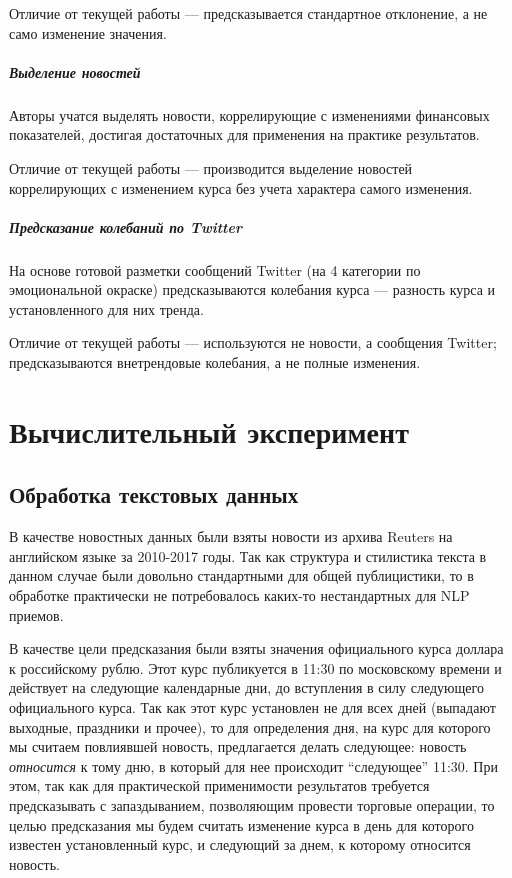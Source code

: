 \documentclass[pdftex,ptm,14pt,a4paper]{report}
\begin{document}
Отличие от текущей работы --- предсказывается стандартное отклонение, а не само изменение значения.

\paragraph{Выделение новостей \cite{select_important_news}}

Авторы учатся выделять новости, коррелирующие с изменениями финансовых показателей, достигая достаточных для
применения на практике результатов.

Отличие от текущей работы --- производится выделение новостей коррелирующих с изменением курса без учета характера
самого изменения.

\paragraph{Предсказание колебаний по Twitter \cite{stock_from_twitter}}

На основе готовой разметки сообщений Twitter (на 4 категории по эмоциональной окраске) предсказываются колебания курса --- разность курса и установленного для них тренда.

Отличие от текущей работы --- используются не новости, а сообщения Twitter; предсказываются внетрендовые колебания,
а не полные изменения.

\chapter{Вычислительный эксперимент}

\section{Обработка текстовых данных}

В качестве новостных данных были взяты новости из архива Reuters на английском языке за 2010-2017 годы.
Так как структура и стилистика текста в данном случае были довольно стандартными для общей публицистики,
то в обработке практически не потребовалось каких-то нестандартных для NLP приемов.

В качестве цели предсказания были взяты значения официального курса доллара к российскому рублю. Этот курс публикуется 
в 11:30 по московскому времени и действует на следующие календарные дни, до вступления в силу следующего
официального курса. Так как этот курс установлен не для всех дней (выпадают выходные, праздники и прочее),
то для определения дня, на курс для которого мы считаем повлиявшей новость, предлагается делать следующее:
новость \textit{относится} к тому дню, в который для нее происходит ``следующее'' 11:30. При этом, так как для практической
применимости результатов требуется предсказывать с запаздыванием, позволяющим провести торговые операции,
то целью предсказания мы будем считать изменение курса в день для которого известен установленный курс, и
следующий за днем, к которому относится новость.
\end{document}
